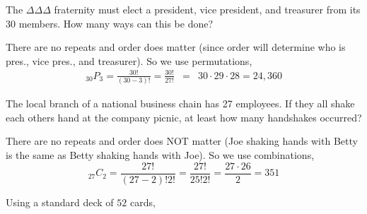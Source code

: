 \documentclass{exam}
\begin{document}
\begin{questions}
\question The $\Delta \Delta \Delta$ fraternity must elect a president, vice president, and treasurer from its 30 members. How many ways can this be done?
    \begin{solution}
        There are no repeats and order does matter (since order will determine
        who is pres., vice pres., and treasurer). So we use permutations,
        \begin{eqnarray*}
        _{30}P_{3}=\frac{30!}{(30-3)!}=\frac{30!}{27!} & = & 30\cdot29\cdot28=24,360
        \end{eqnarray*}
    \end{solution}


\question The local branch of a national business chain has 27 employees. If they all shake each others hand at the company picnic, at least how many handshakes occurred?
    \begin{solution}
        There are no repeats and order does NOT matter (Joe shaking hands
        with Betty is the same as Betty shaking hands with Joe). So we use
        combinations,
        \[
        _{27}C_{2}=\frac{27!}{(27-2)!2!}=\frac{27!}{25!2!}=\frac{27\cdot26}{2}=351
        \]
    \end{solution}


\question Using a standard deck of $52$ cards,



\end{questions}
\end{document}
